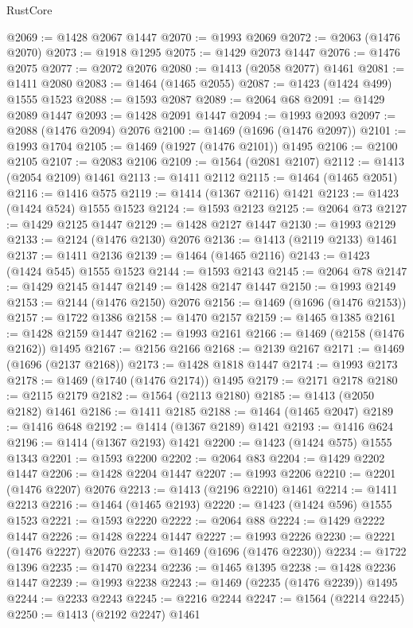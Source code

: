 \begin{lexlean}{RustCore}
\begin{coremodule}
{\begin{coremodule}
{{{{{{{{{{{{{{{{{{{{{{{{{{{{{{{{{{{{{{{{{{{{{{{@2069 := @1428 @2067 @1447
@2070 := @1993 @2069
@2072 := @2063 (@1476 @2070)
@2073 := @1918 @1295
@2075 := @1429 @2073 @1447
@2076 := @1476 @2075
@2077 := @2072 @2076
@2080 := @1413 (@2058 @2077) @1461
@2081 := @1411 @2080
@2083 := @1464 (@1465 @2055)
@2087 := @1423 (@1424 @499) @1555 @1523
@2088 := @1593 @2087
@2089 := @2064 @68
@2091 := @1429 @2089 @1447
@2093 := @1428 @2091 @1447
@2094 := @1993 @2093
@2097 := @2088 (@1476 @2094) @2076
@2100 := @1469 (@1696 (@1476 @2097))
@2101 := @1993 @1704
@2105 := @1469 (@1927 (@1476 @2101)) @1495
@2106 := @2100 @2105
@2107 := @2083 @2106
@2109 := @1564 (@2081 @2107)
@2112 := @1413 (@2054 @2109) @1461
@2113 := @1411 @2112
@2115 := @1464 (@1465 @2051)
@2116 := @1416 @575
@2119 := @1414 (@1367 @2116) @1421
@2123 := @1423 (@1424 @524) @1555 @1523
@2124 := @1593 @2123
@2125 := @2064 @73
@2127 := @1429 @2125 @1447
@2129 := @1428 @2127 @1447
@2130 := @1993 @2129
@2133 := @2124 (@1476 @2130) @2076
@2136 := @1413 (@2119 @2133) @1461
@2137 := @1411 @2136
@2139 := @1464 (@1465 @2116)
@2143 := @1423 (@1424 @545) @1555 @1523
@2144 := @1593 @2143
@2145 := @2064 @78
@2147 := @1429 @2145 @1447
@2149 := @1428 @2147 @1447
@2150 := @1993 @2149
@2153 := @2144 (@1476 @2150) @2076
@2156 := @1469 (@1696 (@1476 @2153))
@2157 := @1722 @1386
@2158 := @1470 @2157
@2159 := @1465 @1385
@2161 := @1428 @2159 @1447
@2162 := @1993 @2161
@2166 := @1469 (@2158 (@1476 @2162)) @1495
@2167 := @2156 @2166
@2168 := @2139 @2167
@2171 := @1469 (@1696 (@2137 @2168))
@2173 := @1428 @1818 @1447
@2174 := @1993 @2173
@2178 := @1469 (@1740 (@1476 @2174)) @1495
@2179 := @2171 @2178
@2180 := @2115 @2179
@2182 := @1564 (@2113 @2180)
@2185 := @1413 (@2050 @2182) @1461
@2186 := @1411 @2185
@2188 := @1464 (@1465 @2047)
@2189 := @1416 @648
@2192 := @1414 (@1367 @2189) @1421
@2193 := @1416 @624
@2196 := @1414 (@1367 @2193) @1421
@2200 := @1423 (@1424 @575) @1555 @1343
@2201 := @1593 @2200
@2202 := @2064 @83
@2204 := @1429 @2202 @1447
@2206 := @1428 @2204 @1447
@2207 := @1993 @2206
@2210 := @2201 (@1476 @2207) @2076
@2213 := @1413 (@2196 @2210) @1461
@2214 := @1411 @2213
@2216 := @1464 (@1465 @2193)
@2220 := @1423 (@1424 @596) @1555 @1523
@2221 := @1593 @2220
@2222 := @2064 @88
@2224 := @1429 @2222 @1447
@2226 := @1428 @2224 @1447
@2227 := @1993 @2226
@2230 := @2221 (@1476 @2227) @2076
@2233 := @1469 (@1696 (@1476 @2230))
@2234 := @1722 @1396
@2235 := @1470 @2234
@2236 := @1465 @1395
@2238 := @1428 @2236 @1447
@2239 := @1993 @2238
@2243 := @1469 (@2235 (@1476 @2239)) @1495
@2244 := @2233 @2243
@2245 := @2216 @2244
@2247 := @1564 (@2214 @2245)
@2250 := @1413 (@2192 @2247) @1461
}}}}}}}}}}}}}}}}}}}}}}}}}}}}}}}}}}}}}}}}}}}}}}}
\end{coremodule}}
\end{coremodule}
\end{lexlean}
